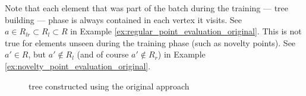 Note that each element that was part of the batch during the training --- tree building --- phase is always contained in each vertex it visits. See $a \in R_{lr} \subset R_{l} \subset R$ in Example \ref{ex:regular_point_evaluation_original}.
This is not true for elements unseen during the training phase (such as novelty points).
See $a' \in R$, but $a' \notin R_l$ (and of course $a' \notin R_r$) in Example \ref{ex:novelty_point_evaluation_original}.

\begin{sidewaysfigure}[htbp]
\centering

\caption{tree constructed using the original approach}
\label{fig:example_noutlier_tree_color}
\end{sidewaysfigure}
